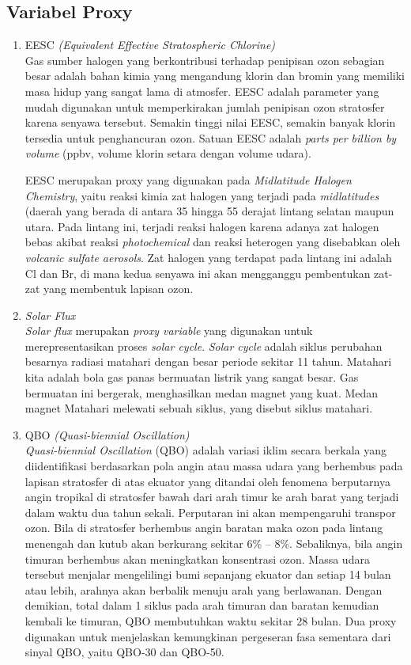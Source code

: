 \subsection{Variabel Proxy}
\begin{enumerate}
    \item EESC \textit{(Equivalent Effective Stratospheric Chlorine)}\\
Gas sumber halogen yang berkontribusi terhadap penipisan ozon sebagian besar adalah bahan kimia yang mengandung klorin dan bromin yang memiliki masa hidup yang sangat lama di atmosfer. EESC adalah parameter yang mudah digunakan untuk memperkirakan jumlah penipisan ozon stratosfer karena senyawa tersebut. Semakin tinggi nilai EESC, semakin banyak klorin tersedia untuk penghancuran ozon. Satuan EESC adalah \textit{parts per billion by volume} (ppbv, volume klorin setara dengan volume udara).

EESC merupakan proxy yang digunakan pada \textit{Midlatitude Halogen Chemistry}, yaitu reaksi kimia zat halogen yang terjadi pada \textit{midlatitudes} (daerah yang berada di antara 35 hingga 55 derajat lintang selatan maupun utara. Pada lintang ini, terjadi reaksi halogen karena adanya zat halogen bebas akibat reaksi \textit{photochemical} dan reaksi heterogen yang disebabkan oleh \textit{volcanic sulfate aerosols}. Zat halogen yang terdapat pada lintang ini adalah Cl dan Br, di mana kedua senyawa ini akan mengganggu pembentukan zat-zat yang membentuk lapisan ozon.

    \item \textit{Solar Flux} \\
\textit{Solar flux} merupakan \textit{proxy variable} yang digunakan untuk merepresentasikan proses \textit{solar cycle}. \textit{Solar cycle} adalah siklus perubahan besarnya radiasi matahari dengan besar periode sekitar 11 tahun. Matahari kita adalah bola gas panas bermuatan listrik yang sangat besar. Gas bermuatan ini bergerak, menghasilkan medan magnet yang kuat. Medan magnet Matahari melewati sebuah siklus, yang disebut siklus matahari.

    \item QBO \textit{(Quasi-biennial Oscillation)} \\
\textit{Quasi-biennial Oscillation} (QBO) adalah variasi iklim secara berkala yang diidentifikasi berdasarkan pola angin atau massa udara yang berhembus pada lapisan stratosfer di atas ekuator yang ditandai oleh fenomena berputarnya angin tropikal di stratosfer bawah dari arah timur ke arah barat yang terjadi dalam waktu dua tahun sekali. Perputaran ini akan mempengaruhi transpor ozon. Bila di stratosfer berhembus angin baratan maka ozon pada lintang menengah dan kutub akan berkurang sekitar 6\% – 8\%. Sebaliknya, bila angin timuran  berhembus akan meningkatkan konsentrasi ozon. Massa udara tersebut menjalar mengelilingi bumi sepanjang ekuator dan setiap 14 bulan atau lebih, arahnya akan berbalik menuju arah yang berlawanan. Dengan demikian, total dalam 1 siklus pada arah timuran dan baratan kemudian kembali ke timuran, QBO membutuhkan waktu sekitar 28 bulan. Dua proxy digunakan untuk menjelaskan kemungkinan pergeseran fasa sementara dari sinyal QBO, yaitu QBO-30 dan QBO-50.


\end{enumerate}
